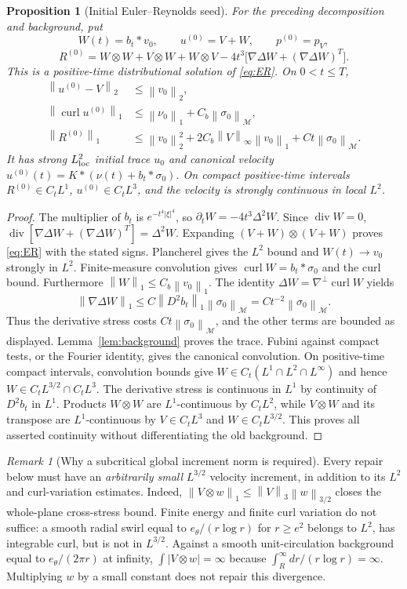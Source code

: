 \documentclass[11pt]{article}
\newtheorem{proposition}[theorem]{Proposition}
\theoremstyle{remark}\newtheorem{remark}[theorem]{Remark}
\newcommand{\M}{\mathcal M}
\newcommand{\curl}{\operatorname{curl}}
\newcommand{\Div}{\operatorname{div}}
\newcommand{\norm}[2]{\left\|#1\right\|_{#2}}
\begin{document}
\begin{proposition}[Initial Euler--Reynolds seed]\label{prop:seed}
For the preceding decomposition and background, put
\[
 W(t)=b_t*v_0,\qquad u^{(0)}=V+W,\qquad p^{(0)}=p_V,
\]
\[
 R^{(0)}=W\otimes W+V\otimes W+W\otimes V
 -4t^3\bigl[\nabla\Delta W+(\nabla\Delta W)^T\bigr].
\]
This is a positive-time distributional solution of \eqref{eq:ER}. On $0<t\leq T$,
\begin{align*}
 \norm{u^{(0)}-V}2&\leq\norm{v_0}2,\\
 \norm{\curl u^{(0)}}1&\leq\norm{\nu_0}1+C_b\norm{\sigma_0}\M,\\
 \norm{R^{(0)}}1&\leq\norm{v_0}2^2
 +2C_b\norm V\infty\norm{v_0}1+Ct\norm{\sigma_0}\M.
\end{align*}
It has strong $L^2_{\rm loc}$ initial trace $u_0$ and canonical velocity
$u^{(0)}(t)=K*(\nu(t)+b_t*\sigma_0)$.
On compact positive-time intervals $R^{(0)}\in C_tL^1$,
$u^{(0)}\in C_tL^3$, and the velocity is strongly continuous in local $L^2$.
\end{proposition}
\begin{proof}
The multiplier of $b_t$ is $e^{-t^4|\xi|^4}$, so
$\partial_tW=-4t^3\Delta^2W$. Since $\Div W=0$,
$\Div[\nabla\Delta W+(\nabla\Delta W)^T]=\Delta^2W$.
Expanding $(V+W)\otimes(V+W)$ proves \eqref{eq:ER} with the stated signs.
Plancherel gives the $L^2$ bound and $W(t)\to v_0$ strongly in $L^2$.
Finite-measure convolution gives $\curl W=b_t*\sigma_0$ and the curl bound.
Furthermore $\norm W1\leq C_b\norm{v_0}1$. The identity
$\Delta W=\nabla^\perp\curl W$ yields
\[
 \norm{\nabla\Delta W}1\leq C\norm{D^2b_t}1\norm{\sigma_0}\M
 =Ct^{-2}\norm{\sigma_0}\M.
\]
Thus the derivative stress costs $Ct\norm{\sigma_0}\M$, and the other
terms are bounded as displayed. Lemma~\ref{lem:background} proves the trace.
Fubini against compact tests, or the Fourier identity, gives the canonical
convolution. On positive-time compact intervals, convolution bounds give
$W\in C_t(L^1\cap L^2\cap L^\infty)$ and hence
$W\in C_tL^{3/2}\cap C_tL^3$. The derivative stress is continuous
in $L^1$ by continuity of $D^2b_t$ in $L^1$. Products $W\otimes W$
are $L^1$-continuous by $C_tL^2$, while $V\otimes W$ and its transpose
are $L^1$-continuous by $V\in C_tL^3$ and $W\in C_tL^{3/2}$.
This proves all asserted continuity without differentiating the old background.
\end{proof}

\begin{remark}[Why a subcritical global increment norm is required]\label{rem:cross}
Every repair below must have an \emph{arbitrarily small} $L^{3/2}$ velocity
increment, in addition to its $L^2$ and curl-variation estimates. Indeed,
$\norm{V\otimes w}1\leq\norm V3\norm w{3/2}$ closes the whole-plane
cross-stress bound. Finite energy and finite curl variation do not suffice:
a smooth radial swirl equal to $e_\theta/(r\log r)$ for $r\geq e^2$ belongs
to $L^2$, has integrable curl, but is not in $L^{3/2}$. Against a smooth
unit-circulation background equal to $e_\theta/(2\pi r)$ at infinity,
$\int|V\otimes w|=\infty$ because $\int_R^\infty dr/(r\log r)=\infty$.
Multiplying $w$ by a small constant does not repair this divergence.
\end{remark}
\end{document}
